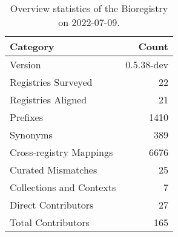 \begin{table}
\centering
\caption{Overview statistics of the Bioregistry on 2022-07-09.}
\label{tab:bioregistry-summary}
\begin{tabular}{lr}
\toprule
                Category &      Count \\
\midrule
                 Version & 0.5.38-dev \\
     Registries Surveyed &         22 \\
      Registries Aligned &         21 \\
                Prefixes &       1410 \\
                Synonyms &        389 \\
 Cross-registry Mappings &       6676 \\
      Curated Mismatches &         25 \\
Collections and Contexts &          7 \\
     Direct Contributors &         27 \\
      Total Contributors &        165 \\
\bottomrule
\end{tabular}
\end{table}
